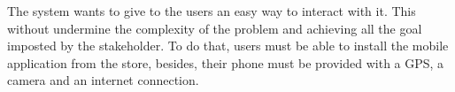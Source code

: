 The system wants to give to the users an easy way to interact with it. This without undermine the complexity of the problem and achieving all the goal imposted by the stakeholder. To do that, users must be able to install the mobile application from the store, besides, their phone must be provided with a GPS, a camera and an internet connection.